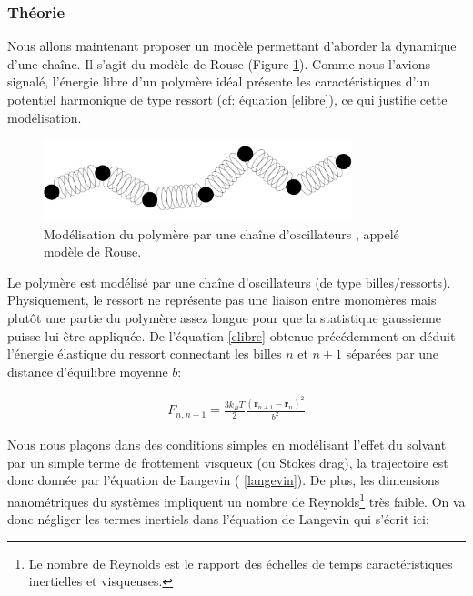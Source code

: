 \subsubsection{Théorie}

Nous allons maintenant proposer un modèle permettant d'aborder la dynamique d'une chaîne. Il s'agit du modèle de Rouse \cite{Rouse1953} (Figure \ref{rouse}). Comme nous l'avions signalé, l'énergie libre d'un polymère idéal présente les caractéristiques d'un potentiel harmonique de type ressort (cf: équation \ref{elibre}), ce qui justifie cette modélisation.

\begin{figure}[H]
\begin{center}
\includegraphics[width=0.8\textwidth]{rouse.jpg}

\caption[Modèle de Rouse]{Modélisation du polymère par une chaîne d'oscillateurs \cite{these}, appelé modèle de Rouse.}
\label{rouse}
\end{center}
\end{figure}

Le polymère est modélisé par une chaîne d'oscillateurs (de type billes/ressorts). Physiquement, le ressort ne représente pas une liaison entre monomères mais plutôt une partie du polymère assez longue pour que la statistique gaussienne puisse lui être appliquée. De l'équation \ref{elibre} obtenue précédemment on déduit l'énergie élastique du ressort connectant les billes $n$ et $n+1$ séparées par une distance d'équilibre moyenne $b$:


\begin{eqnarray}
F_{n,n+1} = \frac{3 k_B T}{2} \frac{(\textbf{r}_{n+1}-\textbf{r}_n)^2}{b^2}
\end{eqnarray}

Nous nous plaçons dans des conditions simples en modélisant l'effet du solvant par un simple terme de frottement visqueux (ou Stokes drag), la trajectoire est donc donnée par l'équation de Langevin ( \ref{langevin}). De plus, les dimensions nanométriques du systèmes impliquent un nombre de Reynolds\footnote{Le nombre de Reynolds est le rapport des échelles de temps caractéristiques inertielles et visqueuses.} très faible. On va donc négliger les termes inertiels dans l'équation de Langevin qui s'écrit ici:

